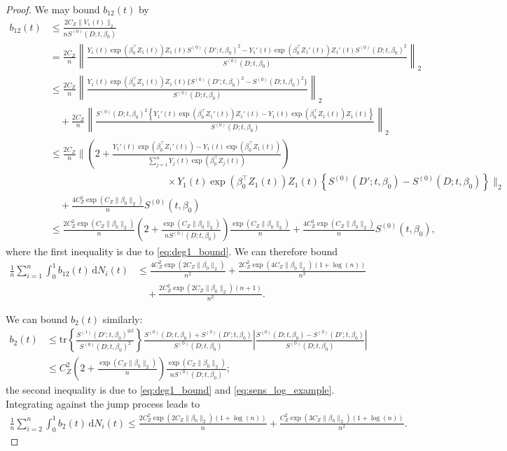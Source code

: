 \documentclass[11pt]{article}
\newcommand{\dint}{\,\mathrm{d}}
\begin{document}
\begin{proof}
We may bound $b_{12}(t)$ by 
\begin{align*}
    b_{12}(t) &\leq \frac{2 C_Z \|V_1(t)\|_2}{nS^{(0)}(D; t, \beta_0)} \\
    &= \frac{2C_Z}{n}  \left\| \frac{ Y_1(t) \exp(\beta_0^\top Z_1(t)) Z_1(t) S^{(0)}(D'; t, \beta_0)^2 - Y_1'(t) \exp(\beta_0^\top Z_1'(t)) Z_1'(t) S^{(0)}(D; t, \beta_0)^2}{S^{(0)}(D; t, \beta_0)}\right\|_2 \\
    &\leq \frac{2C_Z}{n} \left\|\frac{Y_1(t) \exp(\beta_0^\top Z_1(t)) Z_1(t) \{S^{(0)}(D'; t, \beta_0)^2-S^{(0)}(D; t, \beta_0)^2\}}{S^{(0)}(D; t, \beta_0)} \right\|_2 \\
    &\quad + \frac{2 C_Z}{n} \left\| \frac{S^{(0)}(D; t, \beta_0)^2 \left\{ Y_1'(t) \exp(\beta_0^\top Z_1'(t)) Z_1'(t) - Y_1(t) \exp(\beta_0^\top Z_1(t)) Z_1(t) \right\}}{S^{(0)}(D; t, \beta_0)}\right\|_2\\
    &\leq  \frac{2C_Z}{n}  \Bigg\| \left(2+\frac{Y_1'(t) \exp(\beta_0^\top Z_1'(t)) - Y_1(t) \exp(\beta_0^\top Z_1(t))}{\sum_{j=1}^n Y_j(t) \exp(\beta_0^\top Z_j(t))} \right) \\
    &\hspace{5cm} \times Y_1(t) \exp(\beta_0^\top Z_1(t)) Z_1(t) \left\{S^{(0)}(D'; t, \beta_0) -S^{(0)}(D; t, \beta_0) \right\} \Bigg\|_2 \\
    &\quad +  \frac{4 C_Z^2 \exp(C_Z\|\beta_0\|_2)}{n} S^{(0)}(t, \beta_0) \\
    &\leq \frac{2C_Z^2 \exp(C_Z \|\beta_0\|_2)}{n} \left( 2+ \frac{\exp(C_Z \|\beta_0\|_2)}{n S^{(0)}(D; t, \beta_0)}\right) \frac{\exp(C_Z \|\beta_0\|_2)}{n} + \frac{4 C_Z^2 \exp(C_Z\|\beta_0\|_2)}{n} S^{(0)}(t, \beta_0) , 
\end{align*}
where the first inequality is due to \eqref{eq:deg1_bound}. We can therefore bound
\begin{align*}
    \frac{1}{n}\sum_{i=1}^n \int_0^1 b_{12}(t) \dint N_i(t) &\leq \frac{4C_Z^2 \exp(2C_Z\|\beta_0\|_2)}{n^2} + \frac{2C_Z^2 \exp(4C_Z\|\beta_0\|_2 )(1+\log(n))}{n^3} \\
    &\quad +\frac{2 C_Z^2 \exp(2C_Z\|\beta_0\|_2)(n+1)}{n^2}.  
\end{align*}

We can bound $b_2(t)$ similarly:
\begin{align*}
    b_2(t) &\leq \mathrm{tr}\left\{ \frac{S^{(1)}(D'; t, \beta_0)^{\otimes 2}}{S^{(0)}(D;t, \beta_0)^2}\right\}  \frac{S^{(0)}(D; t, \beta_0)+S^{(0)}(D'; t, \beta_0)}{S^{(0)}(D; t, \beta_0)} \left|\frac{S^{(0)}(D; t, \beta_0) - S^{(0)}(D'; t, \beta_0) } {S^{(0)}(D; t, \beta_0)} \right|\\
    &\leq C_Z^2 \left(2 + \frac{ \exp(C_Z\|\beta_0\|_2)}{n} \right) \frac{\exp(C_Z\|\beta_0\|_2)}{nS^{(0)}(D; t, \beta_0)};
\end{align*}
the second inequality is due to \eqref{eq:deg1_bound} and \eqref{eq:sens_log_example}. Integrating against the jump process leads to
\begin{align*}
    \frac{1}{n} \sum_{i=2}^n \int_0^1 b_2(t) \dint N_i(t) \leq \frac{2C_Z^2 \exp(2C_Z \|\beta_0\|_2)(1+ \log(n))}{n} + \frac{C_Z^2 \exp(3C_Z\|\beta_0\|_2)(1+\log(n))}{n^2}. 
\end{align*}


\end{proof}
\end{document}
